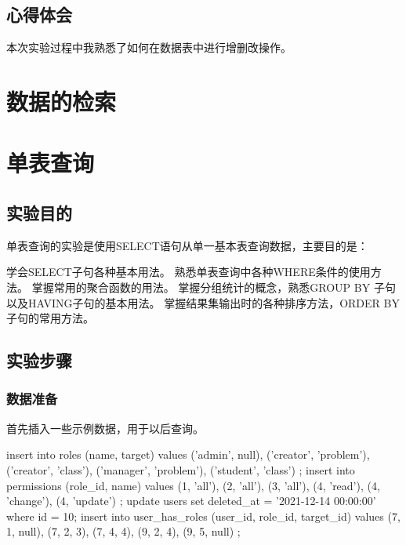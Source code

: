 \documentclass{ctexrep}
\begin{document}
\section{心得体会}

本次实验过程中我熟悉了如何在数据表中进行增删改操作。



\chapter{数据的检索}

\begingroup
\renewcommand{\cleardoublepage}{}
\renewcommand{\clearpage}{}
\chapter*{单表查询}
\endgroup
\section{实验目的}

单表查询的实验是使用SELECT语句从单一基本表查询数据，主要目的是：
\begin{outline}[enumerate]
    \1 学会SELECT子句各种基本用法。
    \1 熟悉单表查询中各种WHERE条件的使用方法。
    \1 掌握常用的聚合函数的用法。
    \1 掌握分组统计的概念，熟悉GROUP BY 子句以及HAVING子句的基本用法。
    \1 掌握结果集输出时的各种排序方法，ORDER  BY子句的常用方法。
\end{outline}
\section{实验步骤}
\subsection{数据准备}
首先插入一些示例数据，用于以后查询。
\begin{run}
    insert into roles (name, target) values 
        ('admin', null),
        ('creator', 'problem'),
        ('creator', 'class'),
        ('manager', 'problem'),
        ('student', 'class')
    ;
    insert into permissions (role_id, name) values 
        (1, 'all'),
        (2, 'all'),
        (3, 'all'),
        (4, 'read'),
        (4, 'change'),
        (4, 'update')
    ;
    update users set deleted_at = '2021-12-14 00:00:00' where id = 10;
    insert into user_has_roles (user_id, role_id, target_id) values 
        (7, 1, null),
        (7, 2, 3),
        (7, 4, 4),
        (9, 2, 4),
        (9, 5, null)
    ;
\end{run}
\end{document}
